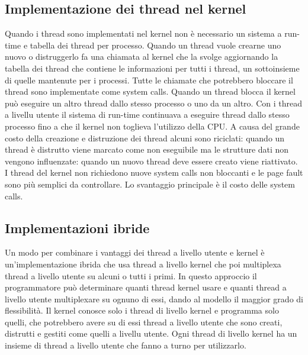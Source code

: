 \subsection{Implementazione dei thread nel kernel}
Quando i thread sono implementati nel kernel non \`e necessario un sistema a run-time e tabella dei thread per processo. Quando un thread vuole crearne uno nuovo o distruggerlo fa una
chiamata al kernel che la svolge aggiornando la tabella dei thread che contiene le informazioni per tutti i thread, un sottoinsieme di quelle mantenute per i processi. Tutte le chiamate
che potrebbero bloccare il thread sono implementate come system calls. Quando un thread blocca il kernel pu\`o eseguire un altro thread dallo stesso processo o uno da un altro. Con i
thread a livellu utente il sistema di run-time continuava a eseguire thread dallo stesso processo fino a che il kernel non toglieva l'utilizzo della CPU. A causa del grande costo della
creazione e distruzione dei thread alcuni sono riciclati: quando un thread \`e distrutto viene marcato come non eseguibile ma le strutture dati non vengono influenzate: quando un nuovo
thread deve essere creato viene riattivato. I thread del kernel non richiedono nuove system calls non bloccanti e le page fault sono pi\`u semplici da controllare. Lo svantaggio
principale \`e il costo delle system calls.
\subsection{Implementazioni ibride}
Un modo per combinare i vantaggi dei thread a livello utente e kernel \`e un'implementazione ibrida che usa thread a livello kernel che poi multiplexa thread a livello utente su alcuni
o tutti i primi. In questo approccio il programmatore pu\`o determinare quanti thread kernel usare e quanti thread a livello utente multiplexare su ognuno di essi, dando al modello il
maggior grado di flessibilit\`a. Il kernel conosce solo i thread di livello kernel e programma solo quelli, che potrebbero avere su di essi thread a livello utente che sono creati,
distrutti e gestiti come quelli a livellu utente. Ogni thread di livello kernel ha un insieme di thread a livello utente che fanno a turno per utilizzarlo.

